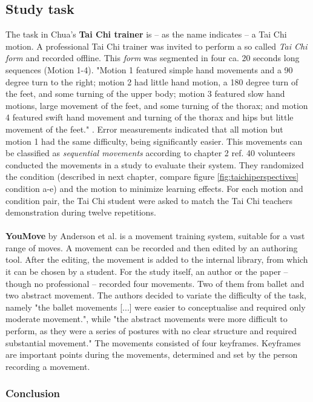 \subsection{Study task}
The task in Chua's \cite{Chua} \textbf{Tai Chi trainer} is \--- as the name indicates \--- a Tai Chi motion. A professional Tai Chi trainer was invited to perform a so called \textit{Tai Chi form} and recorded offline. This \textit{form} was segmented in four ca. 20 seconds long sequences (Motion 1-4). "Motion 1 featured simple hand movements and a 90 degree turn to the right; motion 2 had little hand motion, a 180 degree turn of the feet, and some turning of the upper body; motion 3 featured slow hand motions, large movement of the feet, and some turning of the thorax; and motion 4 featured swift hand movement and turning of the thorax and hips but little movement of the feet." \cite{Chua}. Error measurements indicated that all motion but motion 1 had the same difficulty, being significantly easier. This movements can be classified as \textit{sequential movements} according to chapter 2 \todo ref. 40 volunteers conducted the movements in a study to evaluate their system. They randomized the condition (described in next chapter, compare figure \ref{fig:taichiperspectives} condition a-e) and the motion to minimize learning effects. For each motion and condition pair, the Tai Chi student were asked to match the Tai Chi teachers demonstration during twelve repetitions.\\ \\
\textbf{YouMove} by Anderson et al. \cite{Anderson2013} is a movement training system, suitable for a vast range of moves. A movement can be recorded and then edited by an authoring tool. After the editing, the movement is added to the internal library, from which it can be chosen by a student. For the study itself, an author or the paper \--- though no professional \--- recorded four movements. Two of them from ballet and two abstract movement. The authors decided to variate the difficulty of the task, namely "the ballet movements [...] were easier to conceptualise and required only moderate movement.", while "the abstract movements were more difficult to perform, as they were a series of postures with no clear structure and required substantial movement." The movements consisted of four keyframes. Keyframes are important points during the movements, determined and set by the person recording a movement.

\subsubsection{Conclusion}



